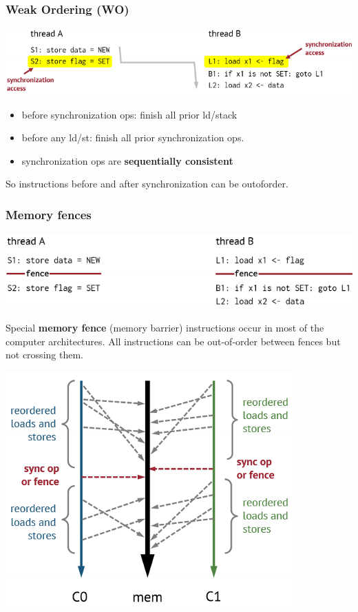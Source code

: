 \documentclass[letterpaper,12pt]{article}
\begin{document}
\subsubsection{Weak Ordering (WO)}
\includegraphics*[scale=0.8]{./Image/Weak Ordering.png}
\begin{itemize}
    \item before synchronization ops: finish all prior ld/stack
    \item before any ld/st: finish all prior synchronization ops.
    \item synchronization ops are \textbf{sequentially consistent}
\end{itemize}
So instructions before and after synchronization can be out\-of\-order.
\subsubsection{Memory fences}
\includegraphics*{./Image/Fences Example.png}

Special \textbf{memory fence} (memory barrier) instructions occur in most of the computer architectures. All instructions can be out-of-order between fences but not crossing them.

\includegraphics*[scale=0.7]{./Image/Ilustrating WO.png}
\end{document}
